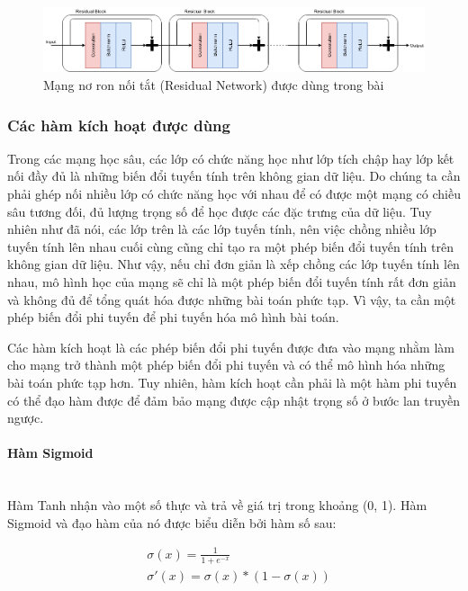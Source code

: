 \begin{figure}[H]
    \centering
    \includegraphics[width=15cm]{./content/materials/residual.png}
    \caption{Mạng nơ ron nối tắt (Residual Network) được dùng trong bài}
\end{figure}

\subsubsection{Các hàm kích hoạt được dùng}

Trong các mạng học sâu, các lớp có chức năng học như lớp tích chập hay lớp kết nối đầy đủ là những biến đổi tuyến tính trên không gian dữ liệu. Do chúng ta cần phải ghép nối nhiều lớp có chức năng học với nhau để có được một mạng có chiều sâu tương đối, đủ lượng trọng số để học được các đặc trưng của dữ liệu. Tuy nhiên như đã nói, các lớp trên là các lớp tuyến tính, nên việc chồng nhiều lớp tuyến tính lên nhau cuối cùng cũng chỉ tạo ra một phép biến đổi tuyến tính trên không gian dữ liệu. Như vậy, nếu chỉ đơn giản là xếp chồng các lớp tuyến tính lên nhau, mô hình học của mạng sẽ chỉ là một phép biến đổi tuyến tính rất đơn giản và không đủ để tổng quát hóa được những bài toán phức tạp. Vì vậy, ta cần một phép biến đổi phi tuyến để phi tuyến hóa mô hình bài toán. 

Các hàm kích hoạt là các phép biến đổi phi tuyến được đưa vào mạng nhằm làm cho mạng trở thành một phép biến đổi phi tuyến và có thể mô hình hóa những bài toán phức tạp hơn. Tuy nhiên, hàm kích hoạt cần phải là một hàm phi tuyến có thể đạo hàm được để đảm bảo mạng được cập nhật trọng số ở bước lan truyền ngược.

\paragraph{Hàm Sigmoid}\mbox{}\\

Hàm Tanh nhận vào một số thực và trả về giá trị trong khoảng (0, 1). Hàm Sigmoid và đạo hàm của nó được biểu diễn bởi hàm số sau:

\begin{equation}
\begin{split}
    & \sigma(x)=\frac{1}{1+e^{-x}}\\
    & \sigma'(x)=\sigma(x)*(1-\sigma(x))\\
\end{split}
\end{equation}

